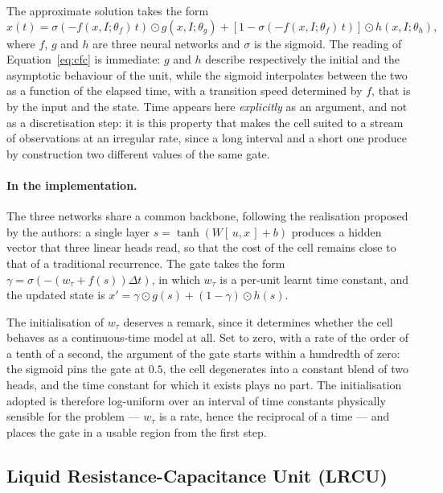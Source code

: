 The approximate solution takes the form
\begin{equation}
  x(t) = \sigma\!\left(-f(x, I; \theta_f)\, t\right) \odot g(x, I; \theta_g)
       + \left[1 - \sigma\!\left(-f(x, I; \theta_f)\, t\right)\right] \odot h(x, I; \theta_h),
  \label{eq:cfc}
\end{equation}
where $f$, $g$ and $h$ are three neural networks and $\sigma$ is the sigmoid.
The reading of Equation~\eqref{eq:cfc} is immediate: $g$ and $h$ describe
respectively the initial and the asymptotic behaviour of the unit, while the
sigmoid interpolates between the two as a function of the elapsed time, with a
transition speed determined by $f$, that is by the input and the state. Time
appears here \emph{explicitly} as an argument, and not as a discretisation step:
it is this property that makes the cell suited to a stream of observations at an
irregular rate, since a long interval and a short one produce by construction
two different values of the same gate.

\paragraph{In the implementation.}
The three networks share a common backbone, following the realisation proposed
by the authors: a single layer $s = \tanh(W [\,u, x\,] + b)$ produces a hidden
vector that three linear heads read, so that the cost of the cell remains close
to that of a traditional recurrence. The gate takes the form
$\gamma = \sigma\!\left(-\left(w_\tau + f(s)\right)\Delta t\right)$, in which
$w_\tau$ is a per-unit learnt time constant, and the updated state is
$x' = \gamma \odot g(s) + (1 - \gamma) \odot h(s)$.

The initialisation of $w_\tau$ deserves a remark, since it determines whether
the cell behaves as a continuous-time model at all. Set to zero, with a rate of
the order of a tenth of a second, the argument of the gate starts within a
hundredth of zero: the sigmoid pins the gate at $0.5$, the cell degenerates into
a constant blend of two heads, and the time constant for which it exists plays
no part. The initialisation adopted is therefore log-uniform over an interval of
time constants physically sensible for the problem --- $w_\tau$ is a rate, hence
the reciprocal of a time --- and places the gate in a usable region from the
first step.

\subsection{Liquid Resistance-Capacitance Unit (LRCU)}
\label{sec:cell-lrcu}

